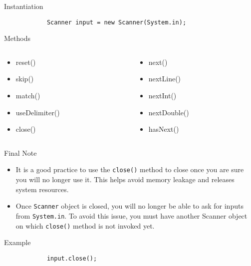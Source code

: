 \documentclass[10pt, compress]{beamer}
\begin{document}
\begin{slide}
	\begin{block}{Instantiation}
		\begin{verbatim}
			Scanner input = new Scanner(System.in);
		\end{verbatim}
	\end{block}
	\begin{block}{Methods}
		\begin{columns}
			\begin{column}{0.5\textwidth}
				\begin{itemize}
					\item[] reset()
					\item[] skip()
					\item[] match()
					\item[] useDelimiter()
					\item[] close()
				\end{itemize}
			\end{column}
			\begin{column}{0.5\textwidth}
				\begin{itemize}
					\item[] next()
					\item[] nextLine()
					\item[] nextInt()
					\item[] nextDouble()
					\item[] hasNext()
				\end{itemize}
			\end{column}
		\end{columns}
	\end{block}
\end{slide}

\begin{slide}
	\begin{block}{Final Note}
		\begin{itemize}
			\item[] It is a good practice to use the \texttt{close()} method to close once you are sure you will no longer use it. This helps avoid memory leakage and releases system resources.
			\item[] Once \texttt{Scanner} object is closed, you will no longer be able to ask for inputs from \texttt{System.in}. To avoid this issue, you must have another Scanner object on which \texttt{close()} method is not invoked yet.
		\end{itemize}
	\end{block}
	\begin{block}{Example}
		\begin{verbatim}
			input.close();
		\end{verbatim}
	\end{block}
\end{slide}
\end{document}
